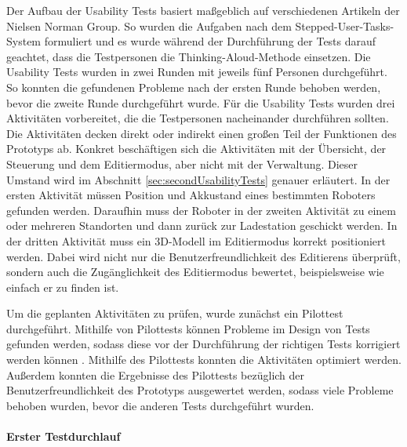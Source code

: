 Der Aufbau der Usability Tests basiert maßgeblich auf verschiedenen Artikeln der Nielsen Norman Group. So wurden die Aufgaben nach dem Stepped-User-Tasks-System \cite{Pernice.2020} formuliert und es wurde während der Durchführung der Tests darauf geachtet, dass die Testpersonen die Thinking-Aloud-Methode \cite{Nielsen.2012b} einsetzen. Die Usability Tests wurden in zwei Runden mit jeweils fünf Personen durchgeführt. So konnten die gefundenen Probleme nach der ersten Runde behoben werden, bevor die zweite Runde durchgeführt wurde. Für die Usability Tests wurden drei Aktivitäten vorbereitet, die die Testpersonen nacheinander durchführen sollten. Die Aktivitäten decken direkt oder indirekt einen großen Teil der Funktionen des Prototyps ab. Konkret beschäftigen sich die Aktivitäten mit der Übersicht, der Steuerung und dem Editiermodus, aber nicht mit der Verwaltung. Dieser Umstand wird im Abschnitt \ref{sec:secondUsabilityTests} genauer erläutert. In der ersten Aktivität müssen Position und Akkustand eines bestimmten Roboters gefunden werden. Daraufhin muss der Roboter in der zweiten Aktivität zu einem oder mehreren Standorten und dann zurück zur Ladestation geschickt werden. In der dritten Aktivität muss ein 3D-Modell im Editiermodus korrekt positioniert werden. Dabei wird nicht nur die Benutzerfreundlichkeit des Editierens überprüft, sondern auch die Zugänglichkeit des Editiermodus bewertet, beispielsweise wie einfach er zu finden ist.

Um die geplanten Aktivitäten zu prüfen, wurde zunächst ein Pilottest durchgeführt. Mithilfe von Pilottests können Probleme im Design von Tests gefunden werden, sodass diese vor der Durchführung der richtigen Tests korrigiert werden können \cite{Schade.2015}. Mithilfe des Pilottests konnten die Aktivitäten optimiert werden. Außerdem konnten die Ergebnisse des Pilottests bezüglich der Benutzerfreundlichkeit des Prototyps ausgewertet werden, sodass viele Probleme behoben wurden, bevor die anderen Tests durchgeführt wurden.

\paragraph{Erster Testdurchlauf}

